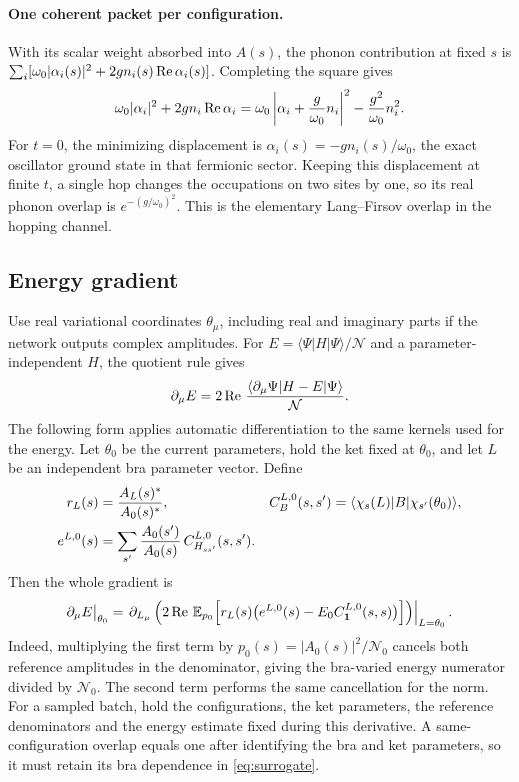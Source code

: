\documentclass[../../main.tex]{subfiles}
\begin{document}
\paragraph{One coherent packet per configuration.}
With its scalar weight absorbed into \(A(s)\), the phonon contribution
at fixed \(s\) is
\(\sum_i [\omega_0|\alpha_i(s)|^2+2g n_i(s)\operatorname{Re}\alpha_i(s)]\).
Completing the square gives
\begin{equation}
 \omega_0|\alpha_i|^2+2g n_i\operatorname{Re}\alpha_i
 =\omega_0\left|\alpha_i+\frac{g}{\omega_0}n_i\right|^2
     -\frac{g^2}{\omega_0}n_i^2 .
 \label{eq:atomic}
\end{equation}
For \(t=0\), the minimizing displacement is
\(\alpha_i(s)=-g n_i(s)/\omega_0\), the exact oscillator ground state in
that fermionic sector. Keeping this displacement at finite \(t\), a
single hop changes the occupations on two sites by one, so its real
phonon overlap is \(e^{-(g/\omega_0)^2}\).
This is the elementary Lang--Firsov overlap in the hopping channel.

\subsection{Energy gradient}
\label{sec:grad}

Use real variational coordinates \(\theta_\mu\), including real and
imaginary parts if the network outputs complex amplitudes. For
\(E=\langle\Psi|H|\Psi\rangle/\mathcal{N}\) and a
parameter-independent \(H\), the quotient rule gives
\begin{equation}
 \partial_\mu E=2\operatorname{Re}\,
 \frac{\langle \partial_\mu\Psi\rvert H-E\lvert \Psi\rangle}{\mathcal{N}}.
 \label{eq:gradient}
\end{equation}
The following form applies automatic differentiation to the same
kernels used for the energy. Let \(\theta_0\) be the current parameters,
hold the ket fixed at \(\theta_0\), and let \(L\) be an independent bra
parameter vector. Define
\begin{align*}
 r_L(s) &=
       \frac{A_L(s)^*}{A_0(s)^*}, &
 C_B^{L,0}(s,s') &= \langle \chi_s(L)\rvert B\lvert \chi_{s'}(\theta_0)\rangle,\\
 e^{L,0}(s)&=
 \sum_{s'}\frac{A_0(s')}{A_0(s)}\,C_{H_{ss'}}^{L,0}(s,s').
\end{align*}
Then the whole gradient is
\begin{equation}
 \partial_\mu E\big|_{\theta_0}
 =\left.\partial_{L_\mu}
 \left(2\operatorname{Re}\,\mathbb{E}_{p_0}\!\left[
     r_L(s)\big(e^{L,0}(s)-E_0 C_{\mathbf{1}}^{L,0}(s,s)\big)
 \right]\right)\right|_{L=\theta_0}.
 \label{eq:surrogate}
\end{equation}
Indeed, multiplying the first term by
\(p_0(s)=|A_0(s)|^2/\mathcal{N}_0\) cancels both reference amplitudes
in the denominator, giving the bra-varied energy numerator divided by
\(\mathcal N_0\). The second term performs the same cancellation for
the norm. For a sampled batch, hold the configurations, the ket
parameters, the reference denominators and the energy estimate fixed
during this derivative. A same-configuration overlap equals one
after identifying the bra and ket parameters, so it must retain
its bra dependence in \cref{eq:surrogate}.
\end{document}
